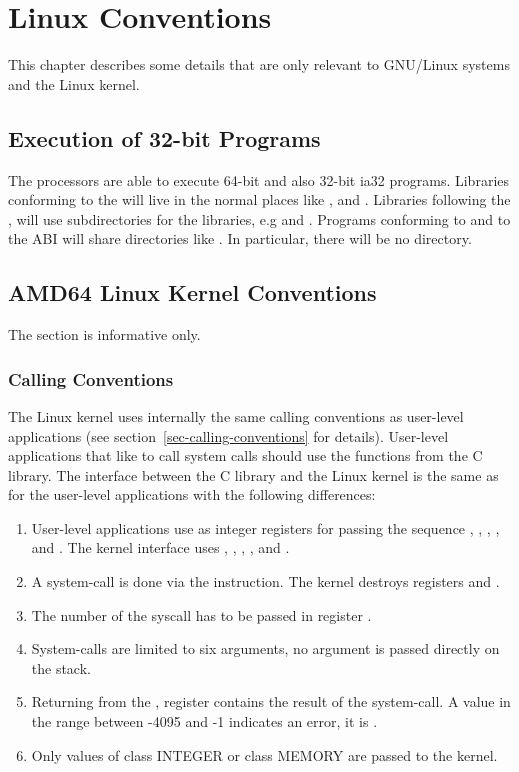 \chapter{Linux Conventions}

This chapter describes some details that are only relevant to 
GNU/Linux systems and the Linux kernel.

\section{Execution of 32-bit Programs}


The \xARCH processors are able to execute 64-bit \xARCH and also
32-bit ia32 programs.  Libraries conforming to the \intelabi will live
in the normal places like ,  and
.  Libraries following the \xARCH, will use
 subdirectories for the libraries, e.g  and
.  Programs conforming to \intelabi and to the \xARCH
ABI will share directories like .  In particular, there
will be no  directory.

\section{AMD64 Linux Kernel Conventions}

The section is informative only.

\subsection{Calling Conventions}

The Linux \xARCH kernel uses internally the same calling conventions as user-level
applications (see section~\ref{sec-calling-conventions} for details).
User-level applications that like to call system calls should use the
functions from the C library.  The interface between the C library and
the Linux kernel is the same as for the user-level applications with
the following differences:
\begin{enumerate}
\item User-level applications use as integer registers for passing the
  sequence \RDI, \RSI, \RDX, \RCX,  and .  The kernel
  interface uses \RDI, \RSI, \RDX, ,  and .
\item A system-call is done via the  instruction.  The
  kernel destroys registers \RCX and .
\item The number of the syscall has to be passed in register \RAX.
\item System-calls are limited to six arguments, no argument is passed
  directly on the stack.
\item Returning from the , register \RAX contains the
  result of the system-call.  A value in the range between -4095 and
  -1 indicates an error, it is .
\item Only values of class INTEGER or class MEMORY are passed to the
  kernel.
\end{enumerate}

